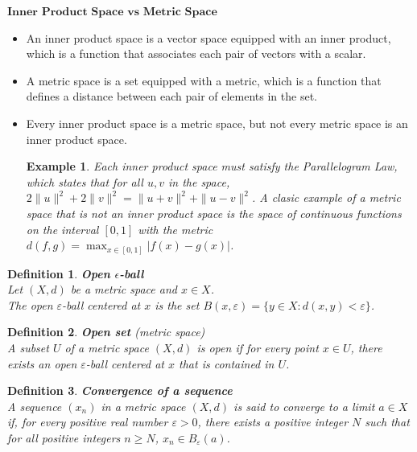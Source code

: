 \documentclass[11pt]{book} %
\newtheorem{definition}{Definition}[section]
\newtheorem*{example*}{Example}
\begin{document}
\( \textbf{Inner Product Space vs Metric Space} \)
\begin{itemize}
    \item An inner product space is a vector space equipped with an inner product, which is a function that associates each pair of vectors with a scalar.
    \item A metric space is a set equipped with a metric, which is a function that defines a distance between each pair of elements in the set.
    \item Every inner product space is a metric space, but not every metric space is an inner product space.
        \begin{example*}
            Each inner product space must satisfy the Parallelogram Law, which states that for all \( u, v \) in the space, \( 2\|u\|^2 + 2\|v\|^2 = \|u + v\|^2 + \|u - v\|^2 \).
            A clasic example of a metric space that is not an inner product space is the space of continuous functions on the interval \([0, 1]\) with the metric \( d(f, g) = \max_{x \in [0, 1]} |f(x) - g(x)| \).
        \end{example*}
\end{itemize}

\begin{definition}{ \textbf{Open $\epsilon$-ball} } \\
    Let \( (X, d) \) be a metric space and \( x \in X \). \\
    The open \(\varepsilon\)-ball centered at \( x \) is the set \(  B(x, \varepsilon) = \{ y \in X : d(x, y) < \varepsilon \} \).
\end{definition}

\begin{definition}{ \textbf{Open set} (metric space) } \\
    A subset \( U \) of a metric space \( (X, d) \) is open if for every point \( x \in U \), 
    there exists an open \(\varepsilon\)-ball centered at \( x \) that is contained in \( U \).
\end{definition}

\begin{definition}{\textbf{Convergence of a sequence}} \\
    A sequence \( (x_n) \) in a metric space \( (X, d) \) is said to \emph{converge} to a limit \( a \in X \) if, for every positive real number \( \varepsilon > 0 \),
    there exists a positive integer \( N \) such that for all positive integers \( n \geq N \), \( x_n \in B_{\varepsilon}(a) \).
\end{definition}
\end{document}
